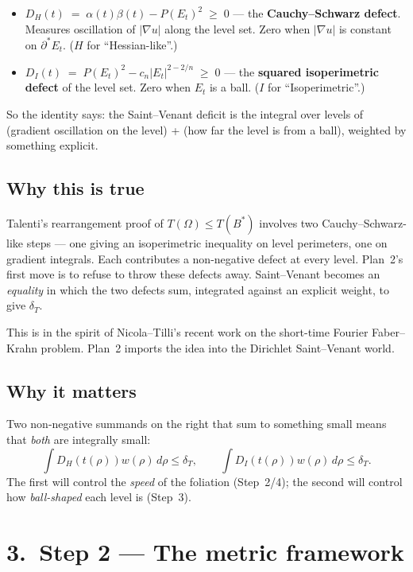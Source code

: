 \documentclass[11pt,a4paper]{article}
\newcommand{\Bstar}{B^{*}}
\newcommand{\deltaT}{\delta_T}
\begin{document}
\begin{itemize}[leftmargin=*]
\item $D_H(t) \;=\; \alpha(t)\beta(t) - P(E_t)^2 \;\ge\; 0$ --- the \textbf{Cauchy--Schwarz defect}. Measures oscillation of $|\nabla u|$ along the level set. Zero when $|\nabla u|$ is constant on $\partial^* E_t$. ($H$ for ``Hessian-like''.)
\item $D_I(t) \;=\; P(E_t)^2 - c_n |E_t|^{2-2/n} \;\ge\; 0$ --- the \textbf{squared isoperimetric defect} of the level set. Zero when $E_t$ is a ball. ($I$ for ``Isoperimetric''.)
\end{itemize}

So the identity says: the Saint--Venant deficit is the integral over levels of (gradient oscillation on the level) + (how far the level is from a ball), weighted by something explicit.

\subsection*{Why this is true}

Talenti's rearrangement proof of $T(\Omega) \le T(\Bstar)$ involves two Cauchy--Schwarz-like steps --- one giving an isoperimetric inequality on level perimeters, one on gradient integrals. Each contributes a non-negative defect at every level. Plan~2's first move is to refuse to throw these defects away. Saint--Venant becomes an \emph{equality} in which the two defects sum, integrated against an explicit weight, to give $\deltaT$.

This is in the spirit of Nicola--Tilli's recent work on the short-time Fourier Faber--Krahn problem. Plan~2 imports the idea into the Dirichlet Saint--Venant world.

\subsection*{Why it matters}

Two non-negative summands on the right that sum to something small means that \emph{both} are integrally small:
\[
\int D_H(t(\rho)) w(\rho)\, d\rho \le \deltaT, \qquad \int D_I(t(\rho)) w(\rho)\, d\rho \le \deltaT.
\]
The first will control the \emph{speed} of the foliation (Step~2/4); the second will control how \emph{ball-shaped} each level is (Step~3).

\section*{3.\ Step 2 --- The metric framework}
\end{document}
